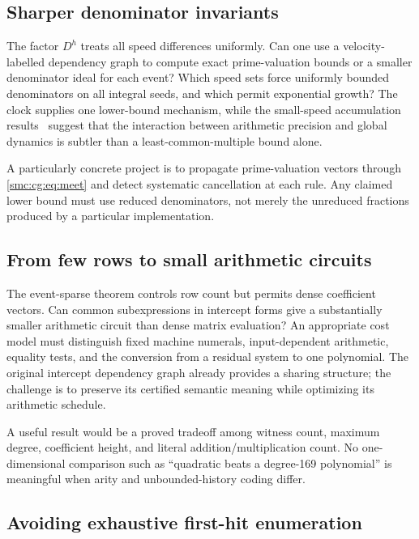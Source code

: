 \documentclass[11pt,letterpaper]{article}
\numberwithin{equation}{section}
\theoremstyle{definition}
\theoremstyle{remark}
\begin{document}
\subsection{Sharper denominator invariants}\label{smc:cg:q:denominators}

The factor $D^h$ treats all speed differences uniformly. Can one use a
velocity-labelled dependency graph to compute exact prime-valuation bounds
or a smaller denominator ideal for each event? Which speed sets force
uniformly bounded denominators on all integral seeds, and which permit
exponential growth? The clock supplies one lower-bound mechanism, while the
small-speed accumulation results~\cite{accumulations} suggest that the
interaction between arithmetic precision and global dynamics is subtler
than a least-common-multiple bound alone.

A particularly concrete project is to propagate prime-valuation vectors
through \eqref{smc:cg:eq:meet} and detect systematic cancellation at each rule.
Any claimed lower bound must use reduced denominators, not merely the
unreduced fractions produced by a particular implementation.

\subsection{From few rows to small arithmetic circuits}\label{smc:cg:q:circuits}

The event-sparse theorem controls row count but permits dense coefficient
vectors. Can common subexpressions in intercept forms give a substantially
smaller arithmetic circuit than dense matrix evaluation? An appropriate
cost model must distinguish fixed machine numerals, input-dependent
arithmetic, equality tests, and the conversion from a residual system to one
polynomial. The original intercept dependency graph already provides a
sharing structure; the challenge is to preserve its certified semantic
meaning while optimizing its arithmetic schedule.

A useful result would be a proved tradeoff among witness count, maximum
degree, coefficient height, and literal addition/multiplication count.
No one-dimensional comparison such as ``quadratic beats a degree-169
polynomial'' is meaningful when arity and unbounded-history coding differ.

\subsection{Avoiding exhaustive first-hit enumeration}\label{smc:cg:q:firsthit}
\end{document}
